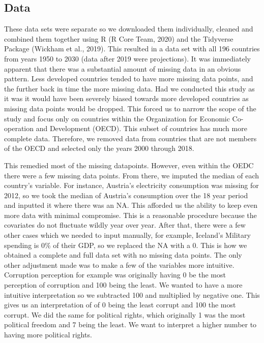 \documentclass[
  english,
  man,floatsintext]{apa6}
\begin{document}
\hypertarget{data}{%
\subsection{Data}\label{data}}

These data sets were separate so we downloaded them individually, cleaned and combined them together using R (R Core Team, 2020) and the Tidyverse Package (Wickham et al., 2019). This resulted in a data set with all 196 countries from years 1950 to 2030 (data after 2019 were projections). It was immediately apparent that there was a substantial amount of missing data in an obvious pattern. Less developed countries tended to have more missing data points, and the further back in time the more missing data. Had we conducted this study as it was it would have been severely biased towards more developed countries as missing data points would be dropped. This forced us to narrow the scope of the study and focus only on countries within the Organization for Economic Co-operation and Development (OECD). This subset of countries has much more complete data. Therefore, we removed data from countries that are not members of the OECD and selected only the years 2000 through 2018.

This remedied most of the missing datapoints. However, even within the OEDC there were a few missing data points. From there, we imputed the median of each country's variable. For instance, Austria's electricity consumption was missing for 2012, so we took the median of Austria's consumption over the 18 year period and inputted it where there was an NA. This afforded us the ability to keep even more data with minimal compromise. This is a reasonable procedure because the covariates do not fluctuate wildly year over year. After that, there were a few other cases which we needed to input manually, for example, Iceland's Military spending is 0\% of their GDP, so we replaced the NA with a 0. This is how we obtained a complete and full data set with no missing data points. The only other adjustment made was to make a few of the variables more intuitive. Corruption perception for example was originally having 0 be the most perception of corruption and 100 being the least. We wanted to have a more intuitive interpretation so we subtracted 100 and multiplied by negative one. This gives us an interpretation of of 0 being the least corrupt and 100 the most corrupt. We did the same for political rights, which originally 1 was the most political freedom and 7 being the least. We want to interpret a higher number to having more political rights.
\end{document}
